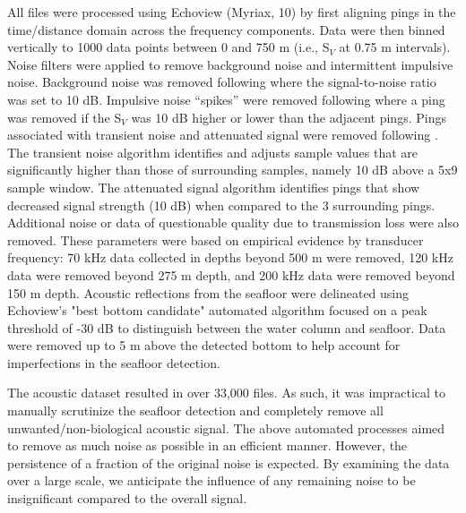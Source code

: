 \documentclass[10pt,letterpaper]{article}
\begin{document}
All files were processed using Echoview (Myriax, 10) by first aligning pings in the time/distance domain across the frequency components. Data were then binned vertically to 1000 data points between 0 and 750 m (i.e., S$_{V}$ at 0.75 m intervals). Noise filters were applied to remove background noise and intermittent impulsive noise. Background noise was removed following \cite{de2007post} where the signal-to-noise ratio was set to 10 dB. Impulsive noise “spikes” were removed following \cite{ryan2015reducing} where a ping was removed if the S$_{V}$ was 10 dB higher or lower than the adjacent pings. Pings associated with transient noise and attenuated signal were removed following \cite{ryan2015reducing}. The transient noise algorithm identifies and adjusts sample values that are significantly higher than those of surrounding samples, namely 10 dB above a 5x9 sample window. The attenuated signal algorithm identifies pings that show decreased signal strength (10 dB) when compared to the 3 surrounding pings. Additional noise or data of questionable quality due to transmission loss were also removed. These parameters were based on empirical evidence by transducer frequency: 70 kHz data collected in depths beyond 500 m were removed, 120 kHz data were removed beyond 275 m depth, and 200 kHz data were removed beyond 150 m depth. Acoustic reflections from the seafloor were delineated using Echoview's "best bottom candidate" automated algorithm focused on a peak threshold of -30 dB to distinguish between the water column and seafloor. Data were removed up to 5 m above the detected bottom to help account for imperfections in the seafloor detection. 

The acoustic dataset resulted in over 33,000 files. As such, it was impractical to manually scrutinize the seafloor detection and completely remove all unwanted/non-biological acoustic signal. The above automated processes aimed to remove as much noise as possible in an efficient manner. However, the persistence of a fraction of the original noise is expected. By examining the data over a large scale, we anticipate the influence of any remaining noise to be insignificant compared to the overall signal.
\end{document}
